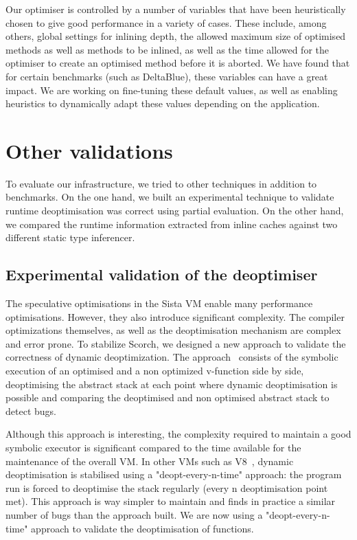 \documentclass[a4paper,12pt,twoside]{../includes/ThesisStyle}
\begin{document}
Our optimiser is controlled by a number of variables that have been heuristically chosen to give good performance in a variety of cases. These include, among others, global settings for inlining depth, the allowed maximum size of optimised methods as well as methods to be inlined, as well as the time allowed for the optimiser to create an optimised method before it is aborted. We have found that for certain benchmarks (such as DeltaBlue), these variables can have a great impact. We are working on fine-tuning these default values, as well as enabling heuristics to dynamically adapt these values depending on the application.

\section{Other validations}

To evaluate our infrastructure, we tried to other techniques in addition to benchmarks. On the one hand, we built an experimental technique to validate runtime deoptimisation was correct using partial evaluation. On the other hand, we compared the runtime information extracted from inline caches against two different static type inferencer.

\subsection{Experimental validation of the deoptimiser}

The speculative optimisations in the Sista VM enable many performance optimisations. However, they also introduce significant complexity. The compiler optimizations themselves, as well as the deoptimisation mechanism are complex and error prone. To stabilize Scorch, we designed a new approach to validate the correctness of dynamic deoptimization. The approach~\cite{Bera16a} consists of the symbolic execution of an optimised and a non optimized v-function side by side, deoptimising the abstract stack at each point where dynamic deoptimisation is possible and comparing the deoptimised and non optimised abstract stack to detect bugs. 

Although this approach is interesting, the complexity required to maintain a good symbolic executor is significant compared to the time available for the maintenance of the overall VM. In other VMs such as V8~\cite{V8}, dynamic deoptimisation is stabilised using a "deopt-every-n-time" approach: the program run is forced to deoptimise the stack regularly (every n deoptimisation point met). This approach is way simpler to maintain and finds in practice a similar number of bugs than the approach built. We are now using a "deopt-every-n-time" approach to validate the deoptimisation of functions.
\end{document}
